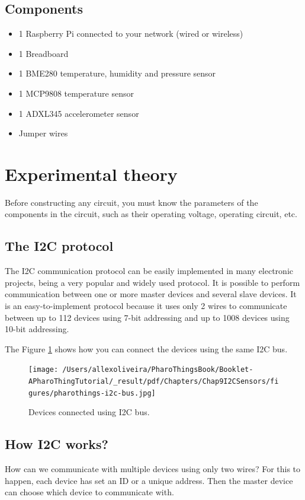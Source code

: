 \documentclass[10pt,twoside,english]{_support/latex/sbabook/sbabook}
\begin{document}
\subsection{Components}
\begin{itemize}
\item 1 Raspberry Pi connected to your network (wired or wireless)
\item 1 Breadboard
\item 1 BME280 temperature, humidity and pressure sensor
\item 1 MCP9808 temperature sensor
\item 1 ADXL345 accelerometer sensor
\item Jumper wires
\end{itemize}
\section{Experimental theory}
Before constructing any circuit, you must know the parameters of the components in the circuit, such as their operating voltage, operating circuit, etc.
\subsection{The I2C protocol}
The I2C communication protocol can be easily implemented in many electronic projects, being a very popular and widely used protocol. It is possible to perform communication between one or more master devices and several slave devices. It is an easy-to-implement protocol because it uses only 2 wires to communicate between up to 112 devices using 7-bit addressing and up to 1008 devices using 10-bit addressing.

The Figure \ref{I2CBus} shows how you can connect the devices using the same I2C bus.


\begin{figure}

\begin{center}
\texttt{[image: /Users/allexoliveira/PharoThingsBook/Booklet-APharoThingTutorial/\_result/pdf/Chapters/Chap9I2CSensors/figures/pharothings-i2c-bus.jpg]}\caption{Devices connected using I2C bus.\label{I2CBus}}\end{center}
\end{figure}

\subsection{How I2C works?}
How can we communicate with multiple devices using only two wires? For this to happen, each device has set an ID or a unique address. Then the master device can choose which device to communicate with.
\end{document}

